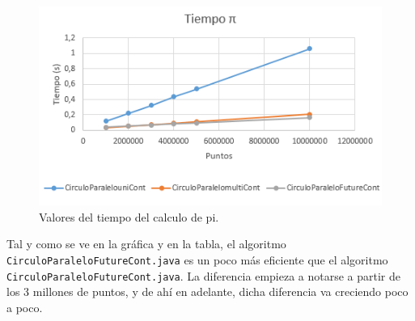 \documentclass[12pt,letterpaper]{article}
\begin{document}
\begin{figure}
	\begin{center}
		\includegraphics[scale=1]{TiempoPi.png}
		\caption{Valores del tiempo del calculo de pi.}
		\label{fig:Valores del calculo de pi}
	\end{center}
\end{figure}
\noindent
Tal y como se ve en la gráfica y en la tabla, el algoritmo \texttt{CirculoParaleloFutureCont.java} es un poco más eficiente que el algoritmo \texttt{CirculoParaleloFutureCont.java}. La diferencia empieza a notarse a partir de los 3 millones de puntos, y de ahí en adelante, dicha diferencia va creciendo poco a poco.
\end{document}
